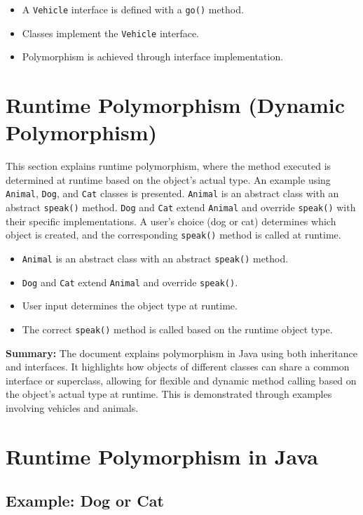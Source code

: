 \documentclass{article}
\begin{document}
\begin{itemize}
\item A \texttt{Vehicle} interface is defined with a \texttt{go()} method.
\item Classes implement the \texttt{Vehicle} interface.
\item Polymorphism is achieved through interface implementation.
\end{itemize}

\section{Runtime Polymorphism (Dynamic Polymorphism)}

This section explains runtime polymorphism, where the method executed is determined at runtime based on the object's actual type.  An example using \texttt{Animal}, \texttt{Dog}, and \texttt{Cat} classes is presented.  \texttt{Animal} is an abstract class with an abstract \texttt{speak()} method. \texttt{Dog} and \texttt{Cat} extend \texttt{Animal} and override \texttt{speak()} with their specific implementations.  A user's choice (dog or cat) determines which object is created, and the corresponding \texttt{speak()} method is called at runtime.

\begin{itemize}
    \item \texttt{Animal} is an abstract class with an abstract \texttt{speak()} method.
    \item \texttt{Dog} and \texttt{Cat} extend \texttt{Animal} and override \texttt{speak()}.
    \item User input determines the object type at runtime.
    \item The correct \texttt{speak()} method is called based on the runtime object type.
\end{itemize}

\textbf{Summary:} The document explains polymorphism in Java using both inheritance and interfaces. It highlights how objects of different classes can share a common interface or superclass, allowing for flexible and dynamic method calling based on the object's actual type at runtime.  This is demonstrated through examples involving vehicles and animals.


\section{Runtime Polymorphism in Java}

\subsection{Example: Dog or Cat}
\end{document}
